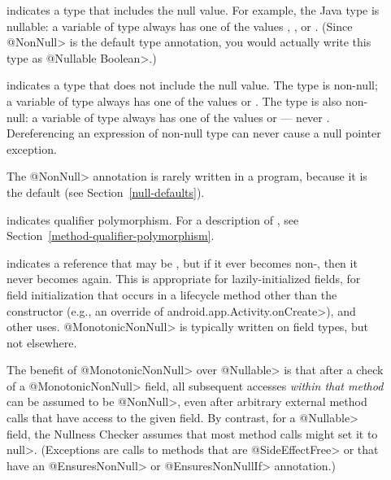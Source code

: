 \begin{description}

\item[]
  indicates a type that includes the null value.  For example, the Java
  type 
  is nullable:  a variable of type  always has one of the
  values , , or .
  (Since \<@NonNull> is the default type annotation, you would actually
  write this type as \<@Nullable Boolean>.)

\item[]
  indicates a type that does not include the null value.  The type
   is non-null; a variable of type  always has
  one of the values  or .  The type  is also non-null:  a variable of type 
  always has one of the values  or  --- never
  .  Dereferencing an expression of non-null type can never cause
  a null pointer exception.

  The \<@NonNull> annotation is rarely written in a program, because it is
  the default (see Section~\ref{null-defaults}).

\item[]
  indicates qualifier polymorphism.  For a description of
  , see
  Section~\ref{method-qualifier-polymorphism}.

\item[]
  indicates a reference that may be , but if it ever becomes
  non-, then it never becomes  again.  This is
  appropriate for lazily-initialized fields, for field initialization that
  occurs in a lifecycle method other than the constructor (e.g., an
  override of \<android.app.Activity.onCreate>), and other uses.
  \<@MonotonicNonNull> is typically written on field types, but not elsewhere.

  \begin{sloppypar}
  The benefit of \<@MonotonicNonNull> over \<@Nullable> is that after a
  check of a \<@MonotonicNonNull> field, all subsequent accesses
  \emph{within that method} can be assumed to be \<@NonNull>, even after
  arbitrary external method calls that have access to the given field.
  By contrast, for a \<@Nullable> field, the Nullness Checker assumes that
  most method calls might set it to \<null>. (Exceptions are calls to
  methods that are \<@SideEffectFree> or that have an \<@EnsuresNonNull> or
  \<@EnsuresNonNullIf> annotation.)
  \end{sloppypar}


\end{description}
